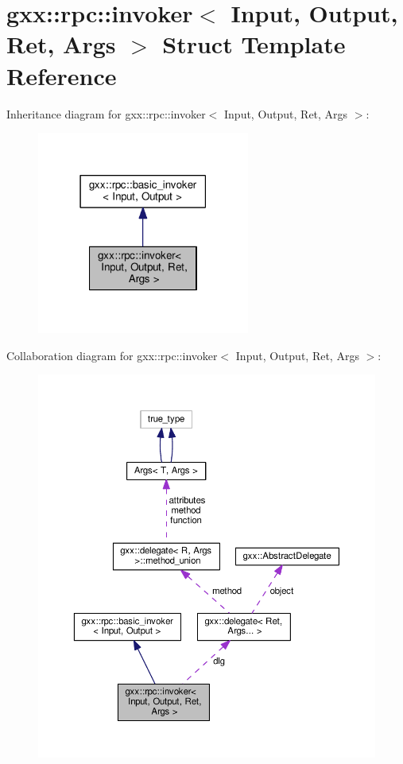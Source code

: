 \hypertarget{structgxx_1_1rpc_1_1invoker}{}\section{gxx\+:\+:rpc\+:\+:invoker$<$ Input, Output, Ret, Args $>$ Struct Template Reference}
\label{structgxx_1_1rpc_1_1invoker}


Inheritance diagram for gxx\+:\+:rpc\+:\+:invoker$<$ Input, Output, Ret, Args $>$\+:
\nopagebreak
\begin{figure}[H]
\begin{center}
\leavevmode
\includegraphics[width=198pt]{structgxx_1_1rpc_1_1invoker__inherit__graph}
\end{center}
\end{figure}


Collaboration diagram for gxx\+:\+:rpc\+:\+:invoker$<$ Input, Output, Ret, Args $>$\+:
\nopagebreak
\begin{figure}[H]
\begin{center}
\leavevmode
\includegraphics[width=350pt]{structgxx_1_1rpc_1_1invoker__coll__graph}
\end{center}
\end{figure}
